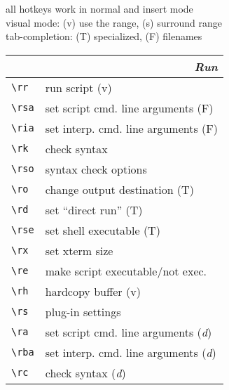 \documentclass[oneside,11pt,landscape,DIV16]{scrartcl}
\begin{document}
\begin{multicols}{3}
\begin{center}
\begin{minipage}[b]{72mm}%
\scriptsize{%
all hotkeys work in normal and insert mode \\
visual mode: {\normalsize (v)} use the range,
{\normalsize (s)} surround range \\
tab-completion: {\normalsize (T)} specialized,
{\normalsize (F)} filenames
}%
\end{minipage}
%
\newpage
%
%
\begin{tabular}[]{|p{11mm}|p{60mm}|}
\hline
\multicolumn{2}{|r|}{\textsl{\textbf{R}un}} \\[1.0ex]
\hline \verb'\rr'  & run script                           \hfill (v)\\
\hline \verb'\rsa' & set script cmd. line arguments       \hfill (F)\\
\hline \verb'\ria' & set interp. cmd. line arguments      \hfill (F)\\
\hline \verb'\rk'  & check syntax                         \\
\hline \verb'\rso' & syntax check options                 \\
\hline \verb'\ro'  & change output destination            \hfill (T)\\
\hline \verb'\rd'  & set ``direct run''                   \hfill (T)\\
\hline \verb'\rse' & set shell executable                 \hfill (T)\\
\hline \verb'\rx'  & set xterm size                       \\
\hline \verb'\re'  & make script executable/not exec.     \\
\hline \verb'\rh'  & hardcopy buffer                      \hfill (v)\\
\hline \verb'\rs'  & plug-in settings                     \\
\hline
\hline \verb'\ra'  & set script cmd. line arguments       \hfill {(\textit{d})}\\
\hline \verb'\rba' & set interp. cmd. line arguments      \hfill {(\textit{d})}\\
\hline \verb'\rc'  & check syntax                         \hfill {(\textit{d})}\\

\end{tabular}
\end{center}
\end{multicols}
\end{document}
